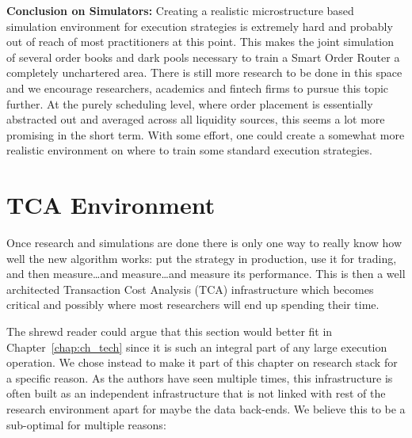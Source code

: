 \noindent\textbf{Conclusion on Simulators:} Creating a realistic microstructure based simulation environment for execution strategies is extremely hard and probably out of reach of most practitioners at this point. This makes the joint simulation of several order books and dark pools necessary to train a Smart Order Router a completely unchartered area. There is still more research to be done in this space and we encourage researchers, academics and fintech firms to pursue this topic further. At the purely scheduling level, where order placement is essentially abstracted out and averaged across all liquidity sources, this seems a lot more promising in the short term. With some effort, one could create a somewhat more realistic environment on where to train some standard execution strategies.



\section{TCA Environment\label{sec:tca_envir}}\label{in:tca_environ}

Once research and simulations are done there is only one way to really know how well the new algorithm works: put the strategy in production, use it for trading, and then measure\dots and measure\dots and measure its performance. This is then a well architected Transaction Cost Analysis (TCA) infrastructure which becomes critical and possibly where most researchers will end up spending their time. 


The shrewd reader could argue that this section would better fit in Chapter~\ref{chap:ch_tech} since it is such an integral part of any large execution operation. We chose instead to make it part of this chapter on research stack for a specific reason. As the authors have seen multiple times, this infrastructure is often built as an independent infrastructure that is not linked with rest of the research environment apart for maybe the data back-ends. We believe this to be a sub-optimal for multiple reasons:


